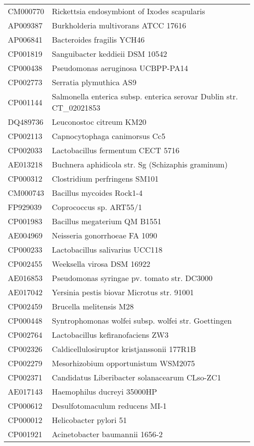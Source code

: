 \begin{longtable}{ll}
CM000770 & Rickettsia endosymbiont of Ixodes scapularis\\
AP009387 & Burkholderia multivorans ATCC 17616\\
AP006841 & Bacteroides fragilis YCH46\\
CP001819 & Sanguibacter keddieii DSM 10542\\
CP000438 & Pseudomonas aeruginosa UCBPP-PA14\\
CP002773 & Serratia plymuthica AS9\\
CP001144 & Salmonella enterica subsp. enterica serovar Dublin str. CT_02021853\\
DQ489736 & Leuconostoc citreum KM20\\
CP002113 & Capnocytophaga canimorsus Cc5\\
CP002033 & Lactobacillus fermentum CECT 5716\\
AE013218 & Buchnera aphidicola str. Sg (Schizaphis graminum)\\
CP000312 & Clostridium perfringens SM101\\
CM000743 & Bacillus mycoides Rock1-4\\
FP929039 & Coprococcus sp. ART55/1\\
CP001983 & Bacillus megaterium QM B1551\\
AE004969 & Neisseria gonorrhoeae FA 1090\\
CP000233 & Lactobacillus salivarius UCC118\\
CP002455 & Weeksella virosa DSM 16922\\
AE016853 & Pseudomonas syringae pv. tomato str. DC3000\\
AE017042 & Yersinia pestis biovar Microtus str. 91001\\
CP002459 & Brucella melitensis M28\\
CP000448 & Syntrophomonas wolfei subsp. wolfei str. Goettingen\\
CP002764 & Lactobacillus kefiranofaciens ZW3\\
CP002326 & Caldicellulosiruptor kristjanssonii 177R1B\\
CP002279 & Mesorhizobium opportunistum WSM2075\\
CP002371 & Candidatus Liberibacter solanacearum CLso-ZC1\\
AE017143 & Haemophilus ducreyi 35000HP\\
CP000612 & Desulfotomaculum reducens MI-1\\
CP000012 & Helicobacter pylori 51\\
CP001921 & Acinetobacter baumannii 1656-2\\

\end{longtable}
